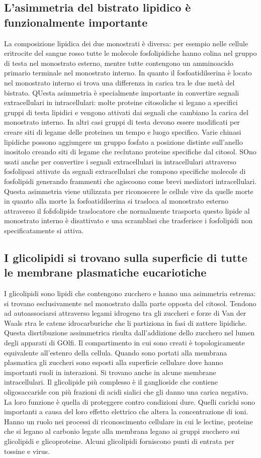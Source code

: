 \subsection{L'asimmetria del bistrato lipidico \`e funzionalmente importante}
La composizione lipidica dei due monostrati \`e diversa: per esempio nelle cellule eritrocite del sangue rosso tutte le molecole fosfolipidiche hanno colina nel gruppo di testa nel 
monostrato esterno, mentre tutte contengono un amminoacido primario terminale nel monostrato interno. In quanto il fosfoatidilserina \`e locato nel monostrato interno si trova una
differenza in carica tra le due met\`a del bistrato. QUesta asimmetria \`e specialmente importante in convertire segnali extracellulari in intracellulari: molte proteine citosoliche
si legano a specifici gruppi di testa lipidici e vengono attivati dai segnali che cambiano la carica del monostrato interno. In altri casi gruppi di testa devono essere modificati per 
creare siti di legame delle proteinea un tempo e luogo specifico. Varie chinasi lipidiche possono aggiungere un gruppo fosfato a posizione distinte sull'anello inositolo creando siti
di legame che reclutano proteine specifiche dal citosol. SOno usati anche per convertire i segnali extracellulari in intracellulari attraverso fosfolipasi attivate da segnali 
extracellulari che rompono specifiche molecole di fosfolipidi generando frammenti che agiscoono come brevi mediatori intracellulari. Questa asimmetria viene utilizzata per riconoscere
le cellule vive da quelle morte in quanto alla morte la fosfoatidilserina si trasloca al monostrato esterno attraverso il fofsfolipide traslocatore che normalmente trasporta questo
lipide al monostrato interno \`e disattivato e una scramblasi che trasferisce i fosfolipidi non specificatamente si attiva.
\subsection{I glicolipidi si trovano sulla superficie di tutte le membrane plasmatiche eucariotiche}
I glicolipidi sono lipidi che contengono zucchero e hanno una asimmetria estrema: si trovano esclusivamente nel monostrato dalla parte opposta del citosol. Tendono ad autoassociarsi
attraverso legami idrogeno tra gli zuccheri e forze di Van der Waals rtra le catene idrocarburiche che li partiziona in fasi di zattere lipidiche. Questa disrtibuzione assimmetrica
risulta dall'addizione dello zucchero nel lumen degli apparati di GOlfi. Il compartimento in cui sono creati \`e topologicamente equivalente all'estenro della cellula. Quando sono 
portati alla membrana plasmatica gli zuccheri sono esposti alla superficie cellulare dove hanno importanti ruoli in interazioni. Si trovano anche in alcune membrane intracellulari. Il
glicolipide pi\`u complesso \`e il ganglioside che contiene oligosaccaride con pi\`u frazioni di acidi sialici che gli danno una carica negativa. La loro funzione \`e quella di 
proteggere contro condizioni dure. Quelli carichi sono importanti a causa del loro effetto elettrico che altera la concentrazione di ioni. Hanno un ruolo nei processi di riconoscimento
cellulare in cui le lectine, proteine che si legano al carbonio legate alla membrana legano ai gruppi zucchero sui glicolipidi e glicoproteine. Alcuni glicolipidi forniscono punti di 
entrata per tossine e virus.
